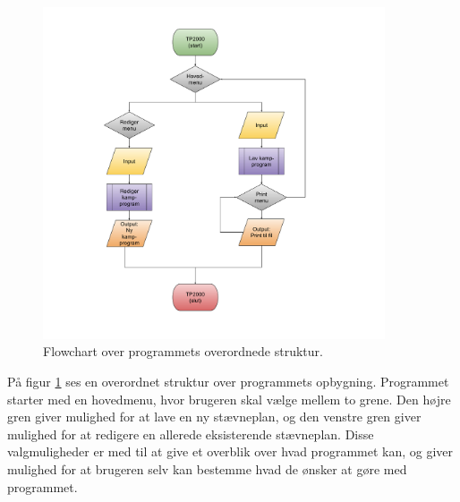\begin{figure}[H]
  \centering
  \includegraphics[width=0.9\textwidth]{figures/Overordnet.pdf}
  \caption{Flowchart over programmets overordnede struktur.}
  \label{fig:overordnet-flowchart}
\end{figure}

På figur \ref{fig:overordnet-flowchart} ses en overordnet struktur over programmets opbygning. Programmet starter med en hovedmenu, hvor brugeren skal vælge mellem to grene. Den højre gren giver mulighed for at lave en ny stævneplan, og den venstre gren giver mulighed for at redigere en allerede eksisterende stævneplan. Disse valgmuligheder er med til at give et overblik over hvad programmet kan, og giver mulighed for at brugeren selv kan bestemme hvad de ønsker at gøre med programmet.

